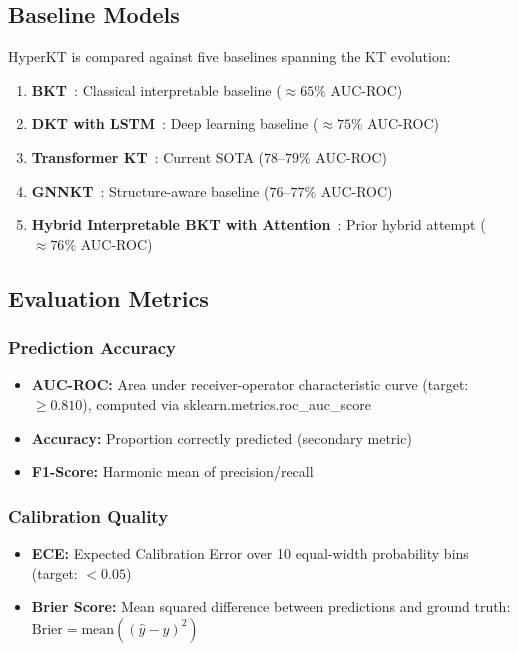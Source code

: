 \documentclass[10pt,twocolumn]{article}
\begin{document}
\subsection{Baseline Models}

HyperKT is compared against five baselines spanning the KT evolution:

\begin{enumerate}
  \item \textbf{BKT}~\cite{corbett1994}: Classical interpretable baseline ($\approx 65\%$ AUC-ROC)
  \item \textbf{DKT with LSTM}~\cite{piech2015}: Deep learning baseline ($\approx 75\%$ AUC-ROC)
  \item \textbf{Transformer KT}~\cite{liu2023}: Current SOTA ($78\text{--}79\%$ AUC-ROC)
  \item \textbf{GNNKT}~\cite{choi2020}: Structure-aware baseline ($76\text{--}77\%$ AUC-ROC)
  \item \textbf{Hybrid Interpretable BKT with Attention}~\cite{nagatani2019}: Prior hybrid attempt ($\approx 76\%$ AUC-ROC)
\end{enumerate}

\subsection{Evaluation Metrics}

\subsubsection{Prediction Accuracy}
\begin{itemize}
  \item \textbf{AUC-ROC:} Area under receiver-operator characteristic curve (target: $\geq 0.810$), computed via sklearn.metrics.roc\_auc\_score
  \item \textbf{Accuracy:} Proportion correctly predicted (secondary metric)
  \item \textbf{F1-Score:} Harmonic mean of precision/recall
\end{itemize}

\subsubsection{Calibration Quality}
\begin{itemize}
  \item \textbf{ECE:} Expected Calibration Error over 10 equal-width probability bins (target: $< 0.05$)
  \item \textbf{Brier Score:} Mean squared difference between predictions and ground truth: $\text{Brier} = \text{mean}((\hat{y} - y)^2)$
\end{itemize}
\end{document}
